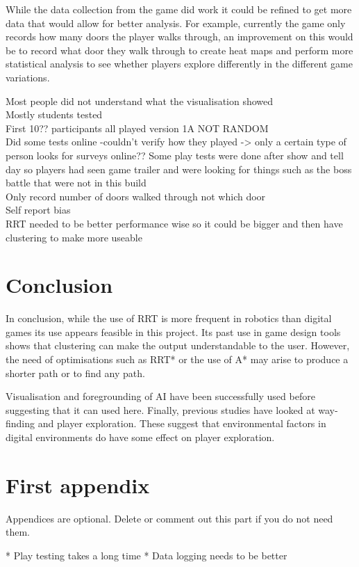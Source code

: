 \documentclass[journal]{IEEEtran}
\begin{document}
While the data collection from the game did work it could be refined to get more data that would allow for better analysis. For example, currently the game only records how many doors the player walks through, an improvement on this would be to record what door they walk through to create heat maps and perform more statistical analysis to see whether players explore differently in the different game variations.

Most people did not understand what the visualisation showed \\ 
Mostly students tested \\
First 10?? participants all played version 1A NOT RANDOM \\
Did some tests online  -couldn't verify how they played -> only a certain type of person looks for surveys online??
Some play tests were done after show and tell day so players had seen game trailer and were looking for things such as the boss battle that were not in this build \\
Only record number of doors walked through not which door \\
Self report bias\\
RRT needed to be better performance wise so it could be bigger and then have clustering to make more useable 

\section{Conclusion} 
In conclusion, while the use of RRT is more frequent in robotics than digital games its use appears feasible in this project. Its past use in game design tools shows that clustering can make the output understandable to the user. However, the need of optimisations such as RRT* or the use of A* may arise to produce a shorter path or to find any path. 

Visualisation and foregrounding of AI have been successfully used before suggesting that it can used here. Finally, previous studies have looked at way-finding and player exploration. These suggest that environmental factors in digital environments do have some effect on player exploration.






 \appendices
 \section{First appendix}
 Appendices are optional. Delete or comment out this part if you do not need them.
 
 * Play testing takes a long time
 * Data logging needs to be better 
 

\end{document}
